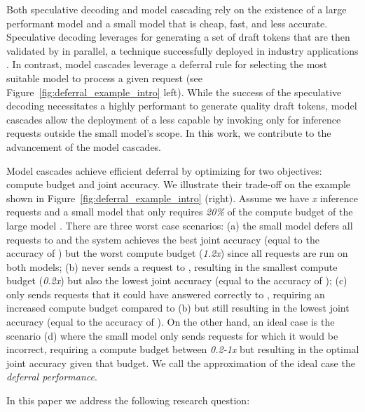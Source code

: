 Both speculative decoding and model cascading  rely on the existence of a large performant model \textbf{\bigmodel} and a small model \textbf{\smallmodel} that is cheap, fast, and less accurate. Speculative decoding leverages \textbf{\smallmodel} for generating a set of draft tokens that are then validated by \textbf{\bigmodel} in parallel, a technique successfully deployed in industry applications \citep{blogpost}. In contrast, model cascades leverage a deferral rule for selecting the most suitable model to process a given request (see Figure~\ref{fig:deferral_example_intro} left). While the success of the speculative decoding necessitates a highly performant \textbf{\smallmodel} to generate quality draft tokens, model cascades allow the deployment of a less capable \textbf{\smallmodel} by invoking \textbf{\bigmodel} only for inference requests outside the small model's scope. In this work, we contribute to the advancement of the model cascades. 

Model cascades achieve efficient deferral by optimizing for two objectives: compute budget and joint accuracy. We illustrate their trade-off on the example shown in Figure~\ref{fig:deferral_example_intro} (right). Assume we have \textit{x} inference requests and a small model \textbf{\smallmodel} that only requires \textit{20\%} of the compute budget of the large model \textbf{\bigmodel}. There are three worst case scenarios: (a) the small model \textbf{\smallmodel} defers all requests to \textbf{\bigmodel} and the system achieves the best joint accuracy (equal to the accuracy of \textbf{\bigmodel}) but the worst compute budget (\textit{1.2x}) since all requests are run on both models; (b) \textbf{\smallmodel} never sends a request to \textbf{\bigmodel}, resulting in the smallest compute budget (\textit{0.2x}) but also the lowest joint accuracy (equal to the accuracy of \textbf{\smallmodel}); (c) \textbf{\smallmodel} only sends requests that it could have answered correctly to \textbf{\bigmodel}, requiring an increased compute budget compared to (b) but still resulting in the lowest joint accuracy (equal to the accuracy of \textbf{\smallmodel}). On the other hand, an ideal case is the scenario (d) where the small model \textbf{\smallmodel} only sends requests for which it would be incorrect, requiring a compute budget between \textit{0.2-1x} but resulting in the optimal joint accuracy given that budget. We call the approximation of the ideal case the \textit{deferral performance}.

In this paper we address the following research question: 

